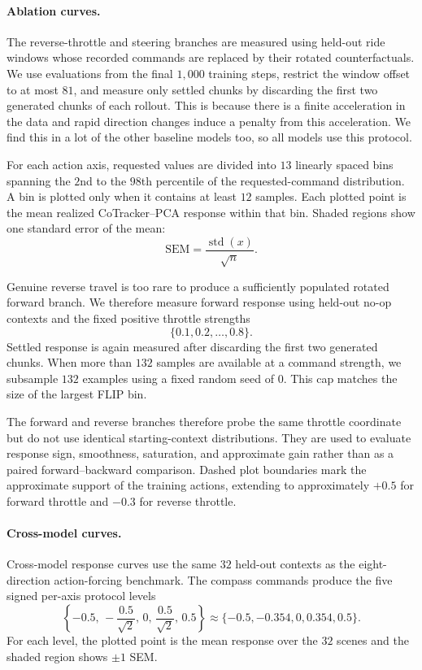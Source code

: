 \documentclass[letterpaper]{article} %
\begin{document}
\paragraph{Ablation curves.}
The reverse-throttle and steering branches are measured using held-out ride
windows whose recorded commands are replaced by their rotated
counterfactuals. We use evaluations from the final $1{,}000$ training steps,
restrict the window offset to at most $81$, and measure only settled chunks by
discarding the first two generated chunks of each rollout. This is because there is a finite acceleration in the data and rapid direction changes induce a penalty from this acceleration. We find this in a lot of the other baseline models too, so all models use this protocol.

For each action axis, requested values are divided into $13$ linearly spaced
bins spanning the $2$nd to the $98$th percentile of the requested-command
distribution. A bin is plotted only when it contains at least $12$ samples.
Each plotted point is the mean realized CoTracker--PCA response within that
bin. Shaded regions show one standard error of the mean:
\[
\mathrm{SEM}
=
\frac{\operatorname{std}(x)}{\sqrt{n}}.
\]

Genuine reverse travel is too rare to produce a sufficiently populated
rotated forward branch. We therefore measure forward response using
held-out no-op contexts and the fixed positive throttle strengths
\[
\{0.1,0.2,\ldots,0.8\}.
\]
Settled response is again measured after discarding the first two generated
chunks. When more than $132$ samples are available at a command strength, we
subsample $132$ examples using a fixed random seed of $0$. This cap matches
the size of the largest FLIP bin.

The forward and reverse branches therefore probe the same throttle coordinate
but do not use identical starting-context distributions. They are used to
evaluate response sign, smoothness, saturation, and approximate gain rather
than as a paired forward--backward comparison. Dashed plot boundaries mark
the approximate support of the training actions, extending to approximately
$+0.5$ for forward throttle and $-0.3$ for reverse throttle.

\paragraph{Cross-model curves.}
Cross-model response curves use the same $32$ held-out contexts as the
eight-direction action-forcing benchmark. The compass commands produce the
five signed per-axis protocol levels
\[
\left\{
-0.5,\,
-\frac{0.5}{\sqrt{2}},\,
0,\,
\frac{0.5}{\sqrt{2}},\,
0.5
\right\}
\approx
\{-0.5,-0.354,0,0.354,0.5\}.
\]
For each level, the plotted point is the mean response over the $32$ scenes
and the shaded region shows $\pm1$ SEM.
\end{document}
